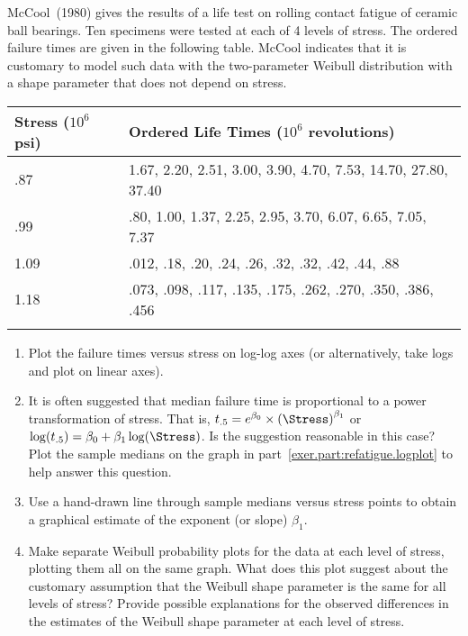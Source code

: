 \begin{exercise}
\label{exercise:rcfatigue.graphical}
McCool~(1980) gives the results of a life test on rolling contact
fatigue of ceramic ball bearings. Ten specimens were tested at each
of 4 levels of stress. The ordered failure times are given in the
following table.  McCool indicates that it is customary to model such
data with the two-parameter Weibull distribution with a shape parameter
that does not depend on stress.\\[3ex]
\begin{tabular}{ll}
Stress ($10^{6}$ psi) &  Ordered Life Times ($10^{6}$ revolutions) \\
\hline
.87 & 1.67, 2.20, 2.51, 3.00, 3.90, 4.70, 7.53, 14.70, 27.80, 37.40 \\
.99& .80, 1.00, 1.37, 2.25, 2.95, 3.70, 6.07, 6.65, 7.05, 7.37 \\ 
1.09& .012, .18, .20, .24, .26, .32, .32, .42, .44, .88 \\ 
1.18 & .073, .098, .117, .135, .175, .262, .270, .350, .386, .456 \\
\hline
\\[2ex]
\end{tabular}
\begin{enumerate}
\item
\label{exer.part:refatigue.logplot}
Plot the failure times versus stress on log-log axes (or alternatively,
take logs and plot on linear axes).
\item
It is often suggested that median failure time is proportional to a
power transformation of stress. That is,  $t_{.5}=
e^{\beta_{0}} \times {(\Stress)}^{\beta_{1}}$ or $\log(t_{.5})=
\beta_{0}+ \beta_{1}\log(\Stress)$. Is the suggestion
reasonable in this case?  Plot the sample medians on the graph in
part~\ref{exer.part:refatigue.logplot} to help answer this question.
\item
\label{exer.part:refatigue.graphical}
Use a hand-drawn line
through sample medians versus stress points to obtain a graphical estimate
of the exponent (or slope) $\beta_{1}$.
\item
Make separate Weibull probability plots for the data at each level of
stress, plotting them all on the same graph. What does this plot
suggest about the customary assumption that the Weibull shape
parameter is the same for all levels of stress?  Provide possible
explanations for the observed differences in the estimates of the
Weibull shape parameter at each level of stress.
\end{enumerate}
\end{exercise}


